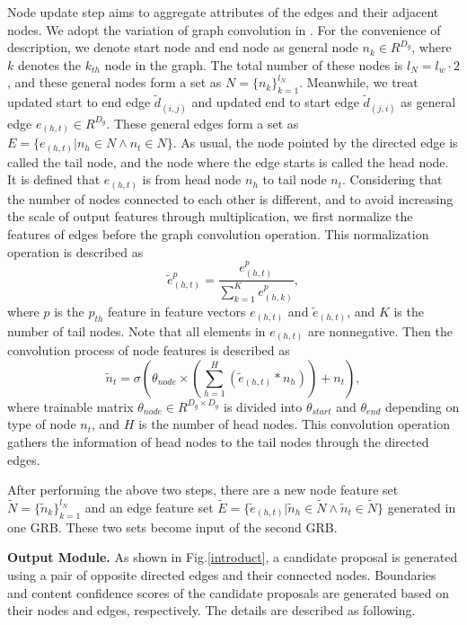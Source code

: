 \documentclass[runningheads]{llncs}
\begin{document}
Node update step aims to aggregate attributes of the edges and their adjacent nodes. We adopt the variation of graph convolution in \cite{EGGN}. For the convenience of description, we denote start node and end node as general node $n_k \in R^{D_g}$, where $k$ denotes the $k_{th}$ node in the graph.  The total number of these nodes is $l_N = l_w \cdot 2$, and these general nodes form a set as $N=\{n_k\}_{k=1}^{l_N}$. Meanwhile, we treat updated start to end edge $\tilde d_{(i,j)}$ and updated end to start edge $\tilde d_{(j,i)}$ as general edge $e_{(h, t)} \in R^{D_g} $. These general edges form a set as $E=\{e_{(h,t)}|n_h \in N \land n_t \in N\}$. As usual, the node pointed by the directed edge is called the tail node, and the node where the edge starts is called the head node. It is defined that $e_{(h, t)}$ is from head node $n_h$ to tail node $n_t$. Considering that the number of nodes connected to each other is different, and to avoid increasing the scale of output features through multiplication, we first normalize the features of edges before the graph convolution operation. This normalization operation is described as
\begin{equation}
\tilde e_{(h, t)}^p = \frac{e_{(h, t)}^p}{\sum_{k=1}^{K} e_{(h, k)}^p},
\end{equation}
where $p$ is the $p_{th}$ feature in feature vectors $e_{(h, t)}$ and $ \tilde e_{(h, t)}$, and $K$ is the number of tail nodes. Note that all elements in $e_{(h, t)}$ are nonnegative.
Then the convolution process of node features is described as
\begin{equation}
\tilde n_t = \sigma(\theta_{node} \times (\sum_{h=1}^{H} (\tilde e_{(h, t)} * n_h)) + n_t),
\end{equation}
where trainable matrix $\theta_{node} \in R^{D_g \times D_g}$ is divided into $\theta_{start}$ and $\theta_{end}$ depending on type of node $n_t$, and $H$ is the number of head nodes. This convolution operation gathers the information of head nodes to the tail nodes through the directed edges.

After performing the above two steps, there are a new node feature set $\tilde N = \{\tilde n_k\}_{k=1}^{l_N}$ and an edge feature set $\tilde E = \{\tilde e_{(h,t)}|\tilde n_h \in \tilde N \land \tilde n_t \in \tilde N\}$  generated in one GRB. These two sets become input of the second GRB.


\noindent\textbf{Output Module.}
As shown in Fig.\ref{introduct}, a candidate proposal is generated using a pair of opposite directed edges and their connected nodes. Boundaries and content confidence scores of the candidate proposals are generated based on their nodes and edges, respectively. The details are described as following.
\end{document}
